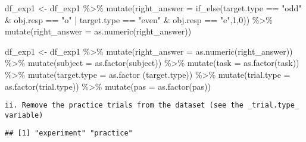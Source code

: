 \documentclass[
]{article}
\newenvironment{Shaded}{\begin{snugshade}}{\end{snugshade}}
\newcommand{\AttributeTok}[1]{\textcolor[rgb]{0.77,0.63,0.00}{#1}}
\newcommand{\DecValTok}[1]{\textcolor[rgb]{0.00,0.00,0.81}{#1}}
\newcommand{\FunctionTok}[1]{\textcolor[rgb]{0.00,0.00,0.00}{#1}}
\newcommand{\NormalTok}[1]{#1}
\newcommand{\OtherTok}[1]{\textcolor[rgb]{0.56,0.35,0.01}{#1}}
\newcommand{\SpecialCharTok}[1]{\textcolor[rgb]{0.00,0.00,0.00}{#1}}
\newcommand{\StringTok}[1]{\textcolor[rgb]{0.31,0.60,0.02}{#1}}
\begin{document}
\begin{Shaded}
\begin{Highlighting}[]
\NormalTok{df\_exp1 }\OtherTok{\textless{}{-}}\NormalTok{ df\_exp1 }\SpecialCharTok{\%\textgreater{}\%} 
  \FunctionTok{mutate}\NormalTok{(}\AttributeTok{right\_answer =} \FunctionTok{if\_else}\NormalTok{(target.type }\SpecialCharTok{==} \StringTok{"odd"} \SpecialCharTok{\&}\NormalTok{ obj.resp }\SpecialCharTok{==} \StringTok{"o"} \SpecialCharTok{|}\NormalTok{ target.type }\SpecialCharTok{==} \StringTok{"even"} \SpecialCharTok{\&}\NormalTok{ obj.resp }\SpecialCharTok{==} \StringTok{"e"}\NormalTok{,}\DecValTok{1}\NormalTok{,}\DecValTok{0}\NormalTok{)) }\SpecialCharTok{\%\textgreater{}\%} 
  \FunctionTok{mutate}\NormalTok{(}\AttributeTok{right\_answer =} \FunctionTok{as.numeric}\NormalTok{(right\_answer))}


\NormalTok{df\_exp1 }\OtherTok{\textless{}{-}}\NormalTok{ df\_exp1 }\SpecialCharTok{\%\textgreater{}\%} 
  \FunctionTok{mutate}\NormalTok{(}\AttributeTok{right\_answer =} \FunctionTok{as.numeric}\NormalTok{(right\_answer)) }\SpecialCharTok{\%\textgreater{}\%} 
  \FunctionTok{mutate}\NormalTok{(}\AttributeTok{subject =} \FunctionTok{as.factor}\NormalTok{(subject)) }\SpecialCharTok{\%\textgreater{}\%} 
  \FunctionTok{mutate}\NormalTok{(}\AttributeTok{task =} \FunctionTok{as.factor}\NormalTok{(task)) }\SpecialCharTok{\%\textgreater{}\%} 
  \FunctionTok{mutate}\NormalTok{(}\AttributeTok{target.type =} \FunctionTok{as.factor}\NormalTok{ (target.type)) }\SpecialCharTok{\%\textgreater{}\%} 
  \FunctionTok{mutate}\NormalTok{(}\AttributeTok{trial.type =} \FunctionTok{as.factor}\NormalTok{(trial.type)) }\SpecialCharTok{\%\textgreater{}\%} 
  \FunctionTok{mutate}\NormalTok{(}\AttributeTok{pas =} \FunctionTok{as.factor}\NormalTok{(pas))}
\end{Highlighting}
\end{Shaded}

\begin{verbatim}
ii. Remove the practice trials from the dataset (see the _trial.type_ variable)
\end{verbatim}

\begin{Shaded}
\end{Shaded}

\begin{verbatim}
## [1] "experiment" "practice"
\end{verbatim}
\end{document}
